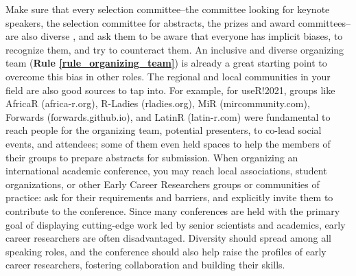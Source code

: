 \documentclass[10pt,letterpaper]{article}
\begin{document}
Make sure that every selection committee--the committee looking for keynote speakers, the selection committee for abstracts, the prizes and award committees--are also diverse \cite{swartzScienceValueDiversity2019, wongBuildDiversityScience2020}, and ask them to be aware that everyone has implicit biases, to recognize them, and try to counteract them. 
An inclusive and diverse organizing team (\textbf{Rule \ref{rule_organizing_team}}) is already a great starting point to overcome this bias in other roles. The regional and local communities in your field are also good sources to tap into. 
For example, for useR!2021, groups like AfricaR (africa-r.org), R-Ladies (rladies.org), MiR (mircommunity.com), Forwards (forwards.github.io), and LatinR (latin-r.com) were fundamental to reach people for the organizing team, potential presenters, to co-lead social events, and attendees; some of them even held spaces to help the members of their groups to prepare abstracts for submission.
When organizing an international academic conference, you may reach local associations, student organizations, or other Early Career Researchers groups or communities of practice: ask for their requirements and barriers, and explicitly invite them to contribute to the conference. %
Since many conferences are held with the primary goal of displaying cutting-edge work led by senior scientists and academics, early career researchers are often disadvantaged. Diversity should spread among all speaking roles, and the conference should also help raise the profiles of early career researchers, fostering collaboration and building their skills.
\end{document}
